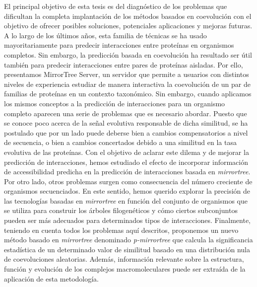 {El principal objetivo de esta tesis es del diagnóstico de los problemas que dificultan la completa implantación de  los métodos basados en coevolución con el objetivo de ofrecer posibles soluciones, potenciales aplicaciones y  mejoras futuras. A lo largo de los últimos años, esta familia de técnicas se ha usado mayoritariamente para predecir interacciones entre proteínas en organismos completos. Sin embargo, la predicción basada en coevolución ha resultado ser útil también para predecir interacciones entre pares de proteínas aisladas. Por ello, presentamos MirrorTree Server, un servidor que permite a usuarios con distintos niveles de experiencia estudiar de manera interactiva la coevolución de un par de familias de proteínas en un contexto taxonómico. Sin embargo, cuando aplicamos los mismos conceptos a la predicción de interacciones para un organismo completo aparecen una serie de problemas que es necesario abordar. Puesto que se conoce poco acerca de la señal evolutiva responsable de dicha similitud, se ha postulado que por un lado puede deberse bien a cambios compensatorios a nivel de secuencia, o bien a cambios concertados debido a una similitud en la tasa evolutiva de las proteínas. Con el objetivo de aclarar este dilema y de mejorar la predicción de interacciones, hemos estudiado el efecto de incorporar información de accessibilidad predicha en la predicción de interacciones basada en \emph{mirrortree}. Por otro lado, otros problemas surgen como consecuencia del número creciente de organismos secuenciados. En este sentido, hemos querido explorar la precisión de las tecnologías basadas en \emph{mirrortree} en función del conjunto de organismos que se utiliza para construir los árboles filogenéticos y cómo ciertos subconjuntos pueden ser más adecuados para determinados tipos de interacciones. Finalmente, teniendo en cuenta todos los problemas aquí descritos, proponemos un nuevo método basado en \emph{mirrortree} denominado \emph{p-mirrortree} que calcula la significancia estadística de un determinado valor de similitud basado en una distribución nula de coevoluciones aleatorias. Además, información relevante sobre la estructura, función y evolución de los complejos macromoleculares puede ser extraída de la aplicación de esta metodología. 
}

\cleardoublepage  %
